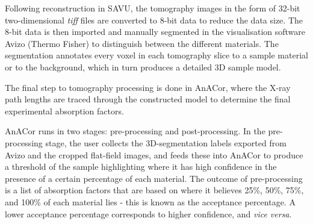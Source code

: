 Following reconstruction in SAVU, the tomography images in the form of 32-bit two-dimensional \textit{tiff} files are converted to 8-bit data to reduce the data size. The 8-bit data is then imported and manually segmented in the visualisation software Avizo (Thermo Fisher) to distinguish between the different materials. The segmentation annotates every voxel in each tomography slice to a sample material or to the background, which in turn produces a detailed 3D sample model.


The final step to tomography processing is done in AnACor, where the X-ray path lengths are traced through the constructed model to determine the final experimental absorption factors.

AnACor runs in two stages: pre-processing and post-processing. In the pre-processing stage, the user collects the 3D-segmentation labels exported from Avizo and the cropped flat-field images, and feeds these into AnACor to produce a threshold of the sample highlighting where it has high confidence in the presence of a certain percentage of each material. The outcome of pre-processing is a list of absorption factors that are based on where it believes 25\%, 50\%, 75\%, and 100\% of each material lies - this is known as the acceptance percentage. A lower acceptance percentage corresponds to higher confidence, and \textit{vice versa}. %

